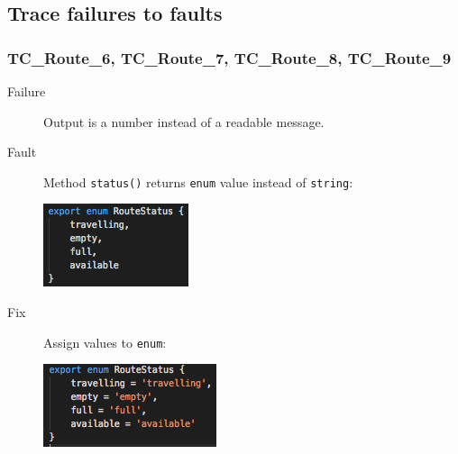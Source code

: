 \documentclass[11pt]{article}
\begin{document}
\subsection{Trace failures to faults}
\label{sec:orgcd6eeb9}

\subsubsection{TC\_Route\_6, TC\_Route\_7, TC\_Route\_8, TC\_Route\_9}
\label{sec:orgfc454a6}

\begin{description}
\item[{Failure}] Output is a number instead of a readable message.
\item[{Fault}] Method \texttt{status()} returns \texttt{enum} value instead of \texttt{string}:
\begin{center}
\includegraphics[width=.9\linewidth]{./Iteration2.rtfd/Pasted Graphic 4.tiff.png}
\end{center}
\item[{Fix}] Assign values to \texttt{enum}:
\begin{center}
\includegraphics[width=.9\linewidth]{./Iteration2.rtfd/Pasted Graphic 5.tiff.png}
\end{center}
\end{description}
\end{document}
